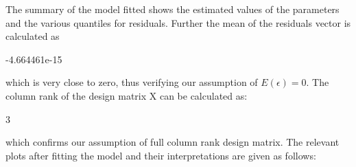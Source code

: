 \documentclass[12pt]{article}
\begin{document}
The summary of the model fitted shows the estimated values of the parameters and the various quantiles for residuals. Further the mean of the residuals vector is calculated as 
\begin{Schunk}
\begin{Soutput}
[1] -4.664461e-15
\end{Soutput}
\end{Schunk}
which is very close to zero, thus verifying our assumption of $E(\epsilon)=0$. The column rank of the design matrix X can be calculated as:
\begin{Schunk}
\begin{Soutput}
[1] 3
\end{Soutput}
\end{Schunk}
which confirms our assumption of full column rank design matrix.
The relevant plots after fitting the model and their interpretations are given as follows:
\end{document}
